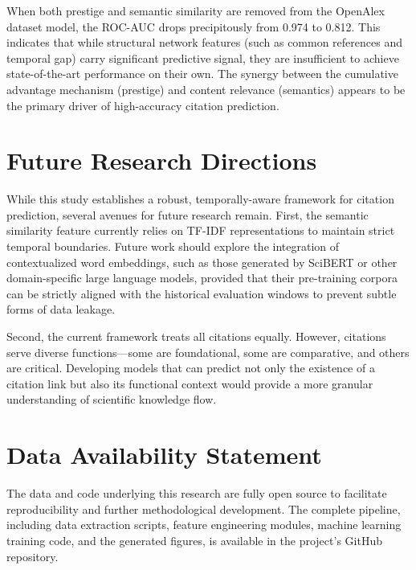\documentclass[12pt,a4paper]{article}
\begin{document}
When both prestige and semantic similarity are removed from the OpenAlex dataset model, the ROC-AUC drops precipitously from 0.974 to 0.812. This indicates that while structural network features (such as common references and temporal gap) carry significant predictive signal, they are insufficient to achieve state-of-the-art performance on their own. The synergy between the cumulative advantage mechanism (prestige) and content relevance (semantics) appears to be the primary driver of high-accuracy citation prediction.

\section{Future Research Directions}
While this study establishes a robust, temporally-aware framework for citation prediction, several avenues for future research remain. First, the semantic similarity feature currently relies on TF-IDF representations to maintain strict temporal boundaries. Future work should explore the integration of contextualized word embeddings, such as those generated by SciBERT or other domain-specific large language models, provided that their pre-training corpora can be strictly aligned with the historical evaluation windows to prevent subtle forms of data leakage.

Second, the current framework treats all citations equally. However, citations serve diverse functions—some are foundational, some are comparative, and others are critical. Developing models that can predict not only the existence of a citation link but also its functional context would provide a more granular understanding of scientific knowledge flow.

\section{Data Availability Statement}
The data and code underlying this research are fully open source to facilitate reproducibility and further methodological development. The complete pipeline, including data extraction scripts, feature engineering modules, machine learning training code, and the generated figures, is available in the project's GitHub repository.

\newpage


\end{document}
